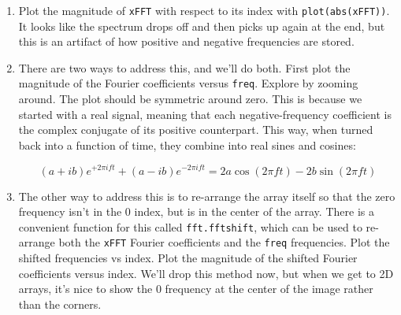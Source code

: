 \documentclass[11pt]{hmcpset}
\begin{document}
\begin{problem}
\begin{enumerate}
   		\item Plot the magnitude of \texttt{xFFT} with respect to its index with \texttt{plot(abs(xFFT))}. It looks like the spectrum drops off and then picks up again at the end, but this is an artifact of how positive and negative frequencies are stored.
   		\item There are two ways to address this, and we'll do both. First plot the magnitude of the Fourier coefficients versus \texttt{freq}. Explore by zooming around. The plot should be symmetric around zero. This is because we started with a real signal, meaning that each negative-frequency coefficient is the complex conjugate of its positive counterpart. This way, when turned back into a function of time, they combine into real sines and cosines:
	    
	    \[(a+ib)e^{+2\pi i f t} + (a-ib)e^{-2\pi i f t} = 2a\cos(2\pi f t) -2 b \sin(2\pi f t)\]
	    \item The other way to address this is to re-arrange the array itself so that the zero frequency isn't in the 0 index, but is in the center of the array. There is a convenient function for this called \texttt{fft.fftshift}, which can be used to re-arrange both the \texttt{xFFT} Fourier coefficients and the \texttt{freq} frequencies. Plot the shifted frequencies vs index. Plot the magnitude of the shifted Fourier coefficients versus index. We'll drop this method now, but when we get to 2D arrays, it's nice to show the 0 frequency at the center of the image rather than the corners.
	\end{enumerate}
\end{problem}

\begin{solution}
	\vfill
\end{solution}
\pagebreak
\end{document}
